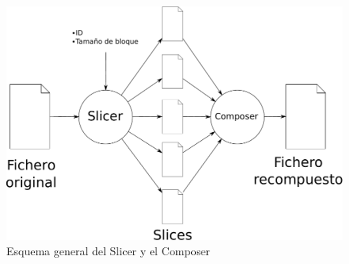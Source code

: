 \begin{figure}[ht]
  \centering
  \includegraphics[scale=0.5]{Figures/Assembler}
  \decoRule
  \caption[Slicer - Composer]{Esquema general del Slicer y el Composer}
  \label{fig:Assembler}
\end{figure}
